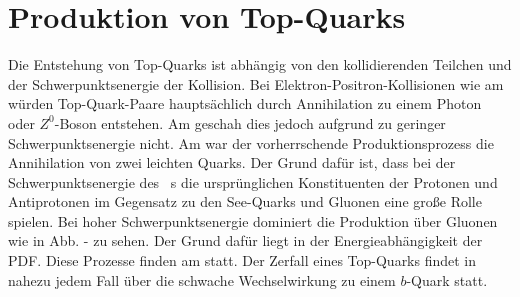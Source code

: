 \section{Produktion von Top-Quarks}
Die Entstehung von Top-Quarks ist abhängig von den kollidierenden Teilchen und der Schwerpunktsenergie der Kollision. Bei Elektron-Positron-Kollisionen wie am \lep würden Top-Quark-Paare hauptsächlich durch Annihilation zu einem Photon oder $Z^0$-Boson entstehen. Am \lep geschah dies jedoch aufgrund zu geringer Schwerpunktsenergie nicht. Am \tevatron war der vorherrschende Produktionsprozess die Annihilation von zwei leichten Quarks. Der Grund dafür ist, dass bei der Schwerpunktsenergie des \tevatron\ s die ursprünglichen Konstituenten der Protonen und Antiprotonen im Gegensatz zu den See-Quarks und Gluonen eine große Rolle spielen. Bei hoher Schwerpunktsenergie dominiert die Produktion über Gluonen wie in Abb. - zu sehen\cite{Lemmer:2014zua}. Der Grund dafür liegt in der Energieabhängigkeit der PDF. Diese Prozesse finden am \lhc statt. Der Zerfall eines Top-Quarks findet in nahezu jedem Fall über die schwache Wechselwirkung zu einem $b$-Quark statt.


